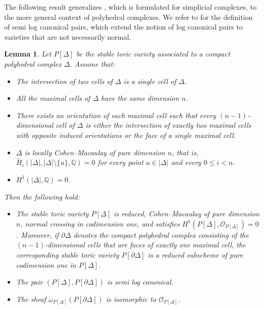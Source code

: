 \documentclass[12pt,letterpaper, reqno]{amsart}
\newtheorem{lemma}[theorem]{Lemma}
\theoremstyle{defstyle} \newtheorem{definition}[theorem]{Definition}
\theoremstyle{remark}
\numberwithin{equation}{section}
\numberwithin{figure}{section}
\newcommand{\cO} {\mathcal{O}}
\newcommand{\QQ} {\mathbb{Q}}
\begin{document}
The following result generalizes \cite[Lemma 17.1]{keel2024log}, which is formulated for simplicial complexes, to the more general context of polyhedral complexes. We refer to \cite{kollar2013singularities, kollar2023families-of-varieties} for the definition of semi log canonical pairs, which extend the notion of log canonical pairs to varieties that are not necessarily normal.


\begin{lemma} \label{lem_2}
Let $P[\Delta]$ be the stable toric variety associated to a compact polyhedral complex $\Delta$.
Assume that:
\begin{itemize}
    \item[(i)] The intersection of two cells of $\Delta$ is a single cell of $\Delta$.
    \item[(ii)] All the maximal cells of $\Delta$ have the same dimension $n$.
    \item[(iii)] There exists an orientation of each maximal cell such that every $(n-1)$-dimensional cell of $\Delta$ is either the intersection of exactly two maximal cells with opposite induced orientations or the face of a single maximal cell.
    \item[(iv)] $\Delta$ is locally Cohen--Macaulay of pure dimension $n$, that is, $\widetilde{H}_i(|\Delta|, |\Delta| \setminus \{u\}, \QQ)=0$ for every point $u \in |\Delta|$ and every $0 \leq i <n$.
    \item[(v)] $H^1(|\Delta|, \QQ)=0$. 
\end{itemize}
Then the following hold:
\begin{itemize}
 \item[(i)] The stable toric variety $P[\Delta]$ is reduced, Cohen--Macaulay of pure dimension $n$, normal crossing in codimension one, and satisfies $H^1(P[\Delta], \cO_{P[\Delta]})=0$. Moreover, if $\partial \Delta$ denotes the compact polyhedral complex consisting of the $(n-1)$-dimensional cells that are faces of exactly one maximal cell, the corresponding stable toric variety $P[\partial \Delta]$ is a reduced subscheme of pure codimension one in $P[\Delta]$.
    \item[(ii)] The pair $(P[\Delta], P[\partial \Delta])$ is semi log canonical.
    \item[(iii)] The sheaf $\omega_{P[\Delta]}(P[\partial \Delta])$ is isomorphic to $\cO_{P[\Delta]}$.
\end{itemize}
\end{lemma}
\end{document}
